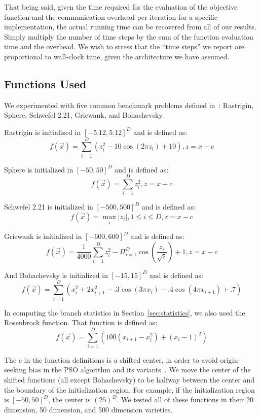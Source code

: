 \documentclass[smallcondensed]{svjour3}
\renewcommand{\sec}[1]{Section~\ref{sec:#1}}
\begin{document}
That being said, given the time required for the evaluation of the objective
function and the communication overhead per iteration for a specific
implementation, the actual running time can be recovered from all of our
results.  Simply multiply the number of time steps by the sum of the function
evaluation time and the overhead.  We wish to stress that the ``time steps'' we
report are proportional to wall-clock time, given the architecture we have
assumed.

\subsection{Functions Used}

We experimented with five common benchmark problems defined
in~\citep{herrera-2010-test-suite}: Rastrigin, Sphere, Schwefel 2.21, Griewank,
and Bohachevsky.

Rastrigin is initialized in $[-5.12,5.12]^D$ and is defined as:
\[f(\Vec{x}) = \sum_{i=1}^D\left(z_i^2 - 10\cos\left(2\pi z_i\right) +
10\right), z=x-c\]

Sphere is initialized in $[-50,50]^D$ and is defined as:
\[f(\Vec{x}) = \sum_{i=1}^D z_i^2, z=x-c\]

Schwefel 2.21 is initialized in $[-500,500]^D$ and is defined as:
\[f(\Vec{x}) = \max_i{|z_i|, 1 \leq i \leq D}, z=x-c\]

Griewank is initialized in $[-600,600]^D$ and is defined as:
\[f(\Vec{x}) = \frac{1}{4000}\sum_{i=1}^D z_i^2 - \Pi_{i=1}^D
\cos\left(\frac{z_i}{\sqrt{i}} \right) + 1, z=x-c\]

And Bohachevsky is initialized in $[-15,15]^D$ and is defined as:
\[f(\Vec{x}) = \sum_{i=1}^D(x_i^2+2x_{i+1}^2-.3\cos(3\pi x_i)-.4\cos(4\pi
x_{i+1})+.7)\]

In computing the branch statistics in \sec{statistics}, we also used the
Rosenbrock function.  That function is defined as:
\[f(\Vec{x}) = \sum_{i=1}^D \left(100(x_{i+1}-x_i^2)+(x_i-1)^2\right)\]

The $c$ in the function definitions is a shifted center, in order to avoid
origin-seeking bias in the PSO algorithm and its
variants~\citep{monson-2005-origin-seeking-bias}.  We move the center of the
shifted functions (all except Bohachevsky) to be halfway between the center and
the boundary of the initialization region.  For example, if the initialization
region is $[-50,50]^D$, the center is $(25)^D$.  We tested all of these
functions in their 20 dimension, 50 dimension, and 500 dimension varieties.
\end{document}
